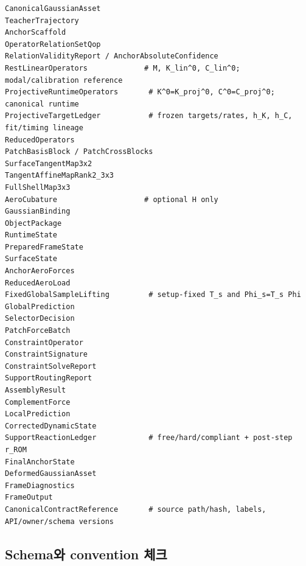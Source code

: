 \documentclass[10pt,a4paper]{article}
\begin{document}
\begin{lstlisting}
CanonicalGaussianAsset
TeacherTrajectory
AnchorScaffold
OperatorRelationSetQop
RelationValidityReport / AnchorAbsoluteConfidence
RestLinearOperators             # M, K_lin^0, C_lin^0; modal/calibration reference
ProjectiveRuntimeOperators       # K^0=K_proj^0, C^0=C_proj^0; canonical runtime
ProjectiveTargetLedger           # frozen targets/rates, h_K, h_C, fit/timing lineage
ReducedOperators
PatchBasisBlock / PatchCrossBlocks
SurfaceTangentMap3x2
TangentAffineMapRank2_3x3
FullShellMap3x3
AeroCubature                    # optional H only
GaussianBinding
ObjectPackage
RuntimeState
PreparedFrameState
SurfaceState
AnchorAeroForces
ReducedAeroLoad
FixedGlobalSampleLifting         # setup-fixed T_s and Phi_s=T_s Phi
GlobalPrediction
SelectorDecision
PatchForceBatch
ConstraintOperator
ConstraintSignature
ConstraintSolveReport
SupportRoutingReport
AssemblyResult
ComplementForce
LocalPrediction
CorrectedDynamicState
SupportReactionLedger            # free/hard/compliant + post-step r_ROM
FinalAnchorState
DeformedGaussianAsset
FrameDiagnostics
FrameOutput
CanonicalContractReference       # source path/hash, labels, API/owner/schema versions
\end{lstlisting}

\subsection*{Schema와 convention 체크}
\end{document}
